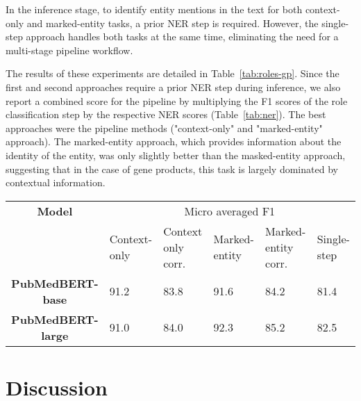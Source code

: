 \documentclass{bioinfo}
\begin{document}
In the inference stage, to identify entity mentions in the text for both context-only and marked-entity tasks, a prior NER step is required. However, the single-step approach handles both tasks at the same time, eliminating the need for a multi-stage pipeline workflow.

The results of these experiments are detailed in Table~\ref{tab:roles-gp}. Since the first and second approaches require a prior NER step during inference, we also report a combined score for the pipeline by multiplying the F1 scores of the role classification step by the respective NER scores (Table~\ref{tab:ner}). The best approaches were the pipeline methods ("context-only" and "marked-entity" approach). The marked-entity approach, which provides information about the identity of the entity, was only slightly better than the masked-entity approach, suggesting that in the case of gene products, this task is largely dominated by contextual information.

\begin{table*}[]
 {


\begin{tabular}{clllll}\toprule
\textbf{Model}             & \multicolumn{5}{c}{Micro averaged F1}                                                 \\ \cline{2-6} 
\textbf{}                  & Context-only & Context only corr. & Marked-entity & Marked-entity corr. & Single-step \\\midrule
\textbf{PubMedBERT-base}   & 91.2         & 83.8               & 91.6          & 84.2                & 81.4        \\
\textbf{PubMedBERT-large}  & 91.0         & 84.0               & 92.3          & 85.2                & 82.5        \\
\end{tabular}

}{}

\end{table*}

\section{Discussion}
\end{document}
